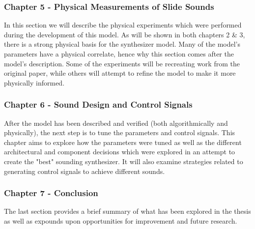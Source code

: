 \documentclass[../main.tex]{subfiles}
\begin{document}
\subsubsection{Chapter 5 - Physical Measurements of Slide Sounds}
In this section we will describe the physical experiments which were performed during the development of this model. As will be shown in both chapters 2 \& 3, there is a strong physical basis for the synthesizer model. Many of the model's parameters have a physical correlate, hence why this section comes after the model's description. Some of the experiments will be recreating work from the original paper, while others will attempt to refine the model to make it more physically informed.

\subsubsection{Chapter 6 - Sound Design and Control Signals}
After the model has been described and verified (both algorithmically and physically), the next step is to tune the parameters and control signals. This chapter aims to explore how the parameters were tuned as well as the different architectural and component decisions which were explored in an attempt to create the "best" sounding synthesizer. It will also examine strategies related to generating control signals to achieve different sounds.

\subsubsection{Chapter 7 - Conclusion}
The last section provides a brief summary of what has been explored in the thesis as well as expounds upon opportunities for improvement and future research.
\end{document}
